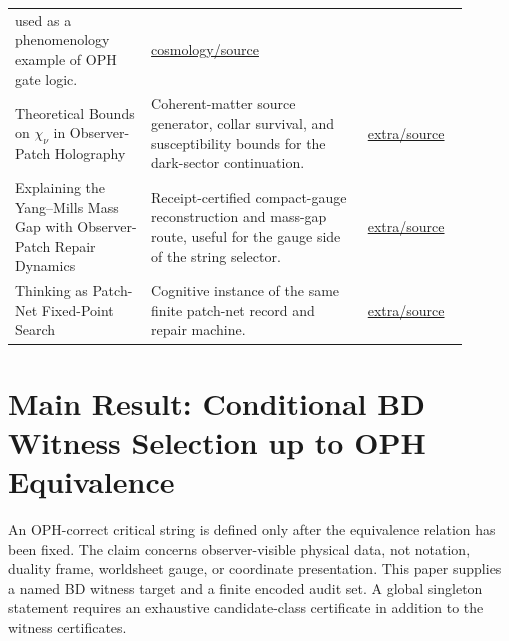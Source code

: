\documentclass[11pt]{article}
\theoremstyle{remark}
\theoremstyle{plain}
\begin{document}
\begin{longtable}{p{0.27\linewidth}p{0.43\linewidth}p{0.20\linewidth}}
used as a phenomenology example of OPH gate logic. &
\href{https://github.com/FloatingPragma/observer-patch-holography/blob/main/cosmology/oph_dark_matter_paper.tex}{cosmology/source} \\
Theoretical Bounds on \(\chi_\nu\) in Observer-Patch Holography & Coherent-matter source generator, collar survival, and
susceptibility bounds for the dark-sector continuation. &
\href{https://github.com/FloatingPragma/observer-patch-holography/blob/main/extra/chi_nu_susceptibility_bounds.tex}{extra/source} \\
Explaining the Yang--Mills Mass Gap with Observer-Patch Repair Dynamics & Receipt-certified compact-gauge reconstruction and mass-gap route, useful for
the gauge side of the string selector. &
\href{https://github.com/FloatingPragma/observer-patch-holography/blob/main/extra/yang_mills_gap_clay_problem.tex}{extra/source} \\
Thinking as Patch-Net Fixed-Point Search & Cognitive instance of the same finite patch-net
record and repair machine. &
\href{https://github.com/FloatingPragma/observer-patch-holography/blob/main/extra/thinking_as_patch_net_fixed_point_search.tex}{extra/source} \\
\bottomrule
\end{longtable}

\section{Main Result: Conditional BD Witness Selection up to OPH Equivalence}

An OPH-correct critical string is defined only after the equivalence relation has been fixed. The
claim concerns observer-visible physical data, not notation, duality frame, worldsheet gauge, or
coordinate presentation. This paper supplies a named BD witness target and a finite encoded audit
set. A global singleton statement requires an exhaustive candidate-class certificate in addition to
the witness certificates.
\end{document}
